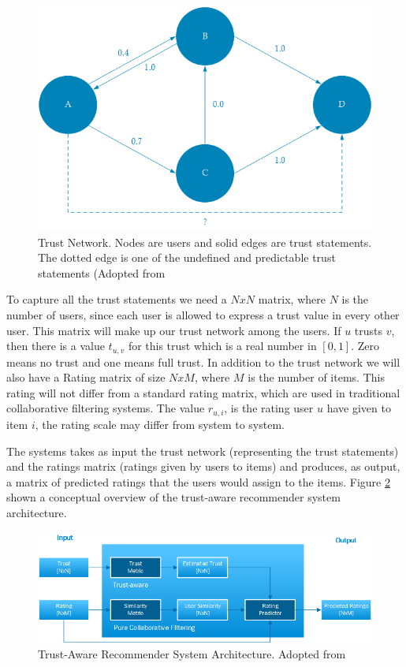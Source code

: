 \begin{figure}[H]
    \includegraphics[width=5in]{image/webofTrust.png}
    \centering
    \caption[Trust Network]{Trust Network. Nodes are users and solid edges are trust statements. The dotted edge is one of the undefined and predictable trust statements (Adopted from \cite{Massa2004}}
    \label{figure:weboftrust}
\end{figure}

To capture all the trust statements we need a $NxN$ matrix, where $N$ is the
number of users, since each user is allowed to express a trust value in every
other user. This matrix will make up our trust network among the users. If $u$
trusts $v$, then there is a value $t_{u,v}$ for this trust which is a real
number in $[0,1]$. Zero means no trust and one means full trust. In addition to
the trust network we will also have a Rating matrix of size $NxM$, where $M$ is
the number of items. This rating will not differ from a standard rating matrix,
which are used in traditional collaborative filtering systems. The value $r_{u,
i}$, is the rating user $u$ have given to item $i$, the rating scale may differ
from system to system.

The systems takes as input the trust network (representing the trust
statements) and the ratings matrix (ratings given by users to items) and
produces, as output, a matrix of predicted ratings that the users would assign
to the items. Figure \ref{figure:trustarchictecture} shown a conceptual
overview of the trust-aware recommender system architecture.

\begin{figure}[H]
    \includegraphics[width=5in]{image/trustawarearchitecture.png}
    \centering
    \caption[Trust-Aware Recommender System Architecture]{Trust-Aware
    Recommender System Architecture. Adopted from \cite{Massa2004}}
    \label{figure:trustarchictecture}
\end{figure}

